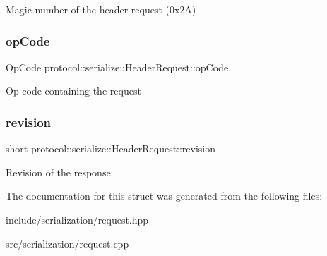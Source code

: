 Magic number of the header request (0x2A) \mbox{\label{structprotocol_1_1serialize_1_1_header_request_a285c64b3712f2116e17eba412c03c986}} 
\subsubsection{\texorpdfstring{op\+Code}{opCode}}
{\footnotesize\ttfamily Op\+Code protocol\+::serialize\+::\+Header\+Request\+::op\+Code}

Op code containing the request \mbox{\label{structprotocol_1_1serialize_1_1_header_request_a9b10c7ac55252322b71c9720854d8d5a}} 
\subsubsection{\texorpdfstring{revision}{revision}}
{\footnotesize\ttfamily short protocol\+::serialize\+::\+Header\+Request\+::revision}

Revision of the response 

The documentation for this struct was generated from the following files\+:\begin{DoxyCompactItemize}
\item 
include/serialization/request.\+hpp\item 
src/serialization/request.\+cpp\end{DoxyCompactItemize}
